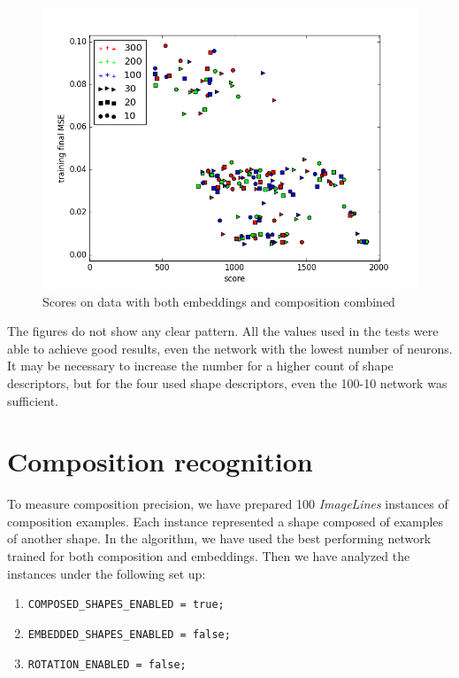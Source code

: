 \begin{description}
\begin{description}
\begin{figure}
\centering
\includegraphics[width=.8\linewidth]{ext/figure_x_arch.png}
\caption{Scores on data with both embeddings and composition combined}
\label{fig:x_arch}
\end{figure}

The figures do not show any clear pattern. All the values used in the tests were able to achieve good results, even the network with the lowest number of neurons. It may be necessary to increase the number for a higher count of shape descriptors, but for the four used shape descriptors, even the 100-10 network was sufficient.

\section{Composition recognition}
To measure composition precision, we have prepared 100 \emph{ImageLines} instances of composition examples. Each instance represented a shape composed of examples of another shape. In the algorithm, we have used the best performing network trained for both composition and embeddings. Then we have analyzed the instances under the following set up:
\begin{enumerate}
\item \texttt{COMPOSED\_SHAPES\_ENABLED = true;}
\item \texttt{EMBEDDED\_SHAPES\_ENABLED = false;}
\item \texttt{ROTATION\_ENABLED = false;}
\end{enumerate}



\end{description}
\end{description}
